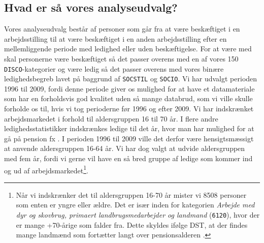 

\subsection{Hvad er så vores analyseudvalg? \label{ledig_analyseudvalg}} 

Vores analyseudvalg består af personer som går fra at være beskæftiget i en arbejdsstilling til at være beskæftiget i en anden arbejdsstilling efter en mellemliggende periode med ledighed eller uden beskæftigelse. For at være med skal personerne være beskæftiget så det passer overens med en af vores 150 \texttt{DISCO}-kategorier og være ledig så det passer overens med vores binære ledighedsbegreb lavet på baggrund af \texttt{SOCSTIL} og \texttt{SOCIO}. Vi har udvalgt perioden 1996 til 2009, fordi denne periode giver os mulighed for at have et datamateriale som har en forholdsvis god kvalitet uden så mange databrud, som vi ville skulle forholde os til, hvis vi tog perioderne før 1996 og efter 2009. Vi har indskrænket arbejdsmarkedet i forhold til aldersgruppen 16 til 70 år. I flere andre ledighedsstatistikker indskrænkes ledige til det år, hvor man har mulighed for at gå på pension fx \parencite{Bjoersted2012, Bang-Petersen2012, DST2014a}. I perioden 1996 til 2009 ville det derfor være hensigtsmæssigt at anvende aldersgruppen 16-64 år. Vi har dog valgt at udvide aldersgruppen med fem år, fordi vi gerne vil have en så bred gruppe af ledige som kommer ind og ud af arbejdsmarkedet\footnote{Når vi indskrænker det til aldersgruppen 16-70 år mister vi 8508 personer som enten er yngre eller ældre. Det er især inden for kategorien \emph{Arbejde med dyr og skovbrug, primaert landbrugsmedarbejder og landmand} (\texttt{6120}), hvor der er mange +70-årige som falder fra. Dette skyldes ifølge DST, at der findes mange landmænd som fortætter langt over pensionsalderen \parencite{DST2012}.}.



